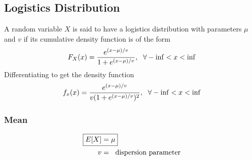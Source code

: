 \documentclass[../probability-notes.tex]{subfiles}
\begin{document}
    \subsection{Logistics Distribution}
    A random variable $X$ is said to have a logistics distribution with parameters $\mu$ and $v$ if its cumulative density function is of the form
    \begin{align*}
        F_{X}(x) = \frac{e^{(x-\mu)/ v}}{1 + e^{(x-\mu)/ v}}, \text{\; $\forall - \inf < x < \inf$}
    \end{align*}
    Differentiating to get the density function
    \begin{align*}
        f_{x}(x) = \frac{e^{(x-\mu)/v}}{v(1 + e^{(x-\mu)/v})^{2}}, \text{\; $\forall -\inf < x < \inf$}
    \end{align*}

    \subsubsection{Mean}
    \begin{align*}
        \Aboxed{E[X] &= \mu}\\
        v &= \text{\; dispersion parameter}
    \end{align*}
\end{document}
